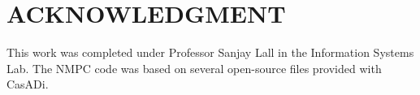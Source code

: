 \documentclass[letterpaper, 10 pt, conference]{ieeeconf}  %
\begin{document}








\section*{ACKNOWLEDGMENT}


This work was completed under Professor Sanjay Lall in the Information Systems Lab. The NMPC code was based on several open-source files provided with CasADi.







\end{document}
